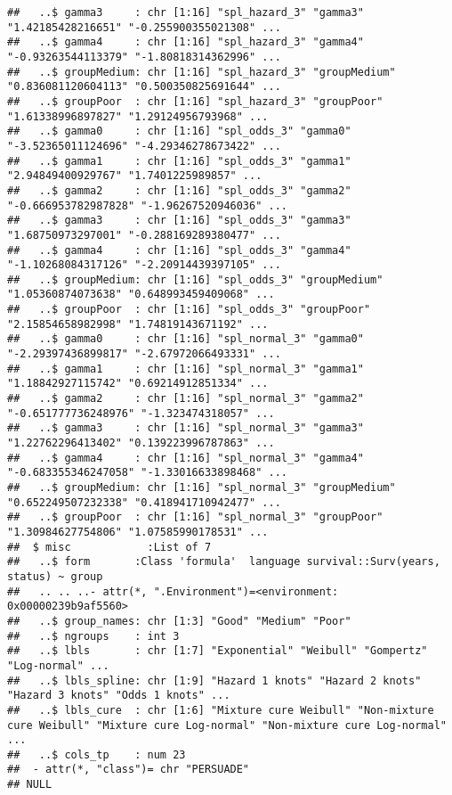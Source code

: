 \documentclass[
]{article}
\begin{document}
\begin{verbatim}
##   ..$ gamma3     : chr [1:16] "spl_hazard_3" "gamma3" "1.42185428216651" "-0.255900355021308" ...
##   ..$ gamma4     : chr [1:16] "spl_hazard_3" "gamma4" "-0.93263544113379" "-1.80818314362996" ...
##   ..$ groupMedium: chr [1:16] "spl_hazard_3" "groupMedium" "0.836081120604113" "0.500350825691644" ...
##   ..$ groupPoor  : chr [1:16] "spl_hazard_3" "groupPoor" "1.61338996897827" "1.29124956793968" ...
##   ..$ gamma0     : chr [1:16] "spl_odds_3" "gamma0" "-3.52365011124696" "-4.29346278673422" ...
##   ..$ gamma1     : chr [1:16] "spl_odds_3" "gamma1" "2.94849400929767" "1.7401225989857" ...
##   ..$ gamma2     : chr [1:16] "spl_odds_3" "gamma2" "-0.666953782987828" "-1.96267520946036" ...
##   ..$ gamma3     : chr [1:16] "spl_odds_3" "gamma3" "1.68750973297001" "-0.288169289380477" ...
##   ..$ gamma4     : chr [1:16] "spl_odds_3" "gamma4" "-1.10268084317126" "-2.20914439397105" ...
##   ..$ groupMedium: chr [1:16] "spl_odds_3" "groupMedium" "1.05360874073638" "0.648993459409068" ...
##   ..$ groupPoor  : chr [1:16] "spl_odds_3" "groupPoor" "2.15854658982998" "1.74819143671192" ...
##   ..$ gamma0     : chr [1:16] "spl_normal_3" "gamma0" "-2.29397436899817" "-2.67972066493331" ...
##   ..$ gamma1     : chr [1:16] "spl_normal_3" "gamma1" "1.18842927115742" "0.69214912851334" ...
##   ..$ gamma2     : chr [1:16] "spl_normal_3" "gamma2" "-0.651777736248976" "-1.323474318057" ...
##   ..$ gamma3     : chr [1:16] "spl_normal_3" "gamma3" "1.22762296413402" "0.139223996787863" ...
##   ..$ gamma4     : chr [1:16] "spl_normal_3" "gamma4" "-0.683355346247058" "-1.33016633898468" ...
##   ..$ groupMedium: chr [1:16] "spl_normal_3" "groupMedium" "0.652249507232338" "0.418941710942477" ...
##   ..$ groupPoor  : chr [1:16] "spl_normal_3" "groupPoor" "1.30984627754806" "1.07585990178531" ...
##  $ misc            :List of 7
##   ..$ form       :Class 'formula'  language survival::Surv(years, status) ~ group
##   .. .. ..- attr(*, ".Environment")=<environment: 0x00000239b9af5560> 
##   ..$ group_names: chr [1:3] "Good" "Medium" "Poor"
##   ..$ ngroups    : int 3
##   ..$ lbls       : chr [1:7] "Exponential" "Weibull" "Gompertz" "Log-normal" ...
##   ..$ lbls_spline: chr [1:9] "Hazard 1 knots" "Hazard 2 knots" "Hazard 3 knots" "Odds 1 knots" ...
##   ..$ lbls_cure  : chr [1:6] "Mixture cure Weibull" "Non-mixture cure Weibull" "Mixture cure Log-normal" "Non-mixture cure Log-normal" ...
##   ..$ cols_tp    : num 23
##  - attr(*, "class")= chr "PERSUADE"
## NULL
\end{verbatim}

\clearpage
\end{document}
